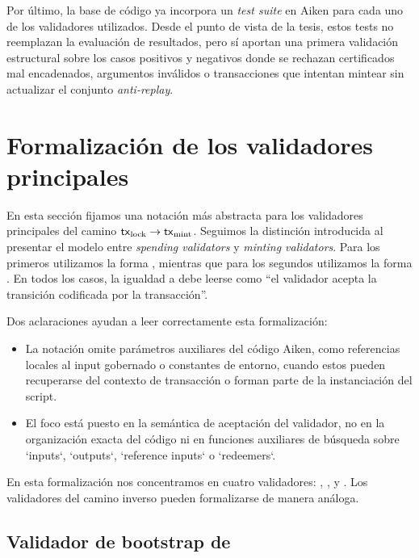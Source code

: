 Por último, la base de código ya incorpora un \textit{test suite} en Aiken para cada uno de los validadores utilizados. Desde el punto de vista de la tesis, estos tests no reemplazan la evaluación de resultados, pero sí aportan una primera validación estructural sobre los casos positivos y negativos donde se rechazan certificados mal encadenados, argumentos \ZK inválidos o transacciones que intentan mintear sin actualizar el conjunto \textit{anti-replay}.

\section{Formalización de los validadores principales}
\label{sec:validadores-y-flujo-transaccional-formalizacion-de-los-validadores-principales}

En esta sección fijamos una notación más abstracta para los validadores principales del camino $\mathsf{tx}_{\mathrm{lock}} \rightarrow \mathsf{tx}_{\mathrm{mint}}$. Seguimos la distinción introducida al presentar el modelo \eUTxO entre \textit{spending validators} y \textit{minting validators}. Para los primeros utilizamos la forma \SpendValidatorSchema, mientras que para los segundos utilizamos la forma \MintValidatorSchema. En todos los casos, la igualdad a \True debe leerse como ``el validador acepta la transición codificada por la transacción''.

Dos aclaraciones ayudan a leer correctamente esta formalización:

\begin{itemize}[noitemsep]
  \item La notación omite parámetros auxiliares del código Aiken, como referencias locales al input gobernado o constantes de entorno, cuando estos pueden recuperarse del contexto de transacción o forman parte de la instanciación del script.
  \item El foco está puesto en la semántica de aceptación del validador, no en la organización exacta del código ni en funciones auxiliares de búsqueda sobre `inputs`, `outputs`, `reference inputs` o `redeemers`.
\end{itemize}

En esta formalización nos concentramos en cuatro validadores: \StakeDistributionMintValidator, \StakeDistributionSpendValidator, \MintingValidator y \TxsUpdaterMintingValidator. Los validadores del camino inverso pueden formalizarse de manera análoga. 

\subsection{Validador de bootstrap de \StakeDistribution}
\label{subsec:validadores-y-flujo-transaccional-validador-de-bootstrap-de-stakedistribution}

